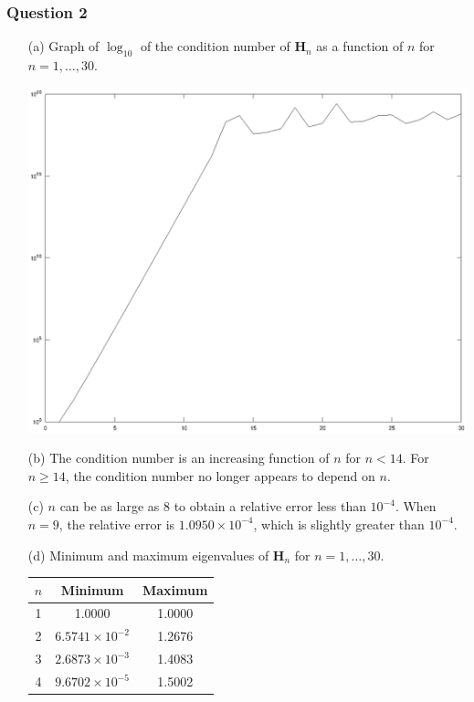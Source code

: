 \documentclass[11pt,a4paper]{article}
\begin{document}
\subsubsection*{Question 2}
\begin{enumerate}
	\item[(a)] Graph of $\log_{10}$ of the condition number of $\mathbf{H}_n$ as a function of $n$ for $n=1, \ldots , 30$.
	\begin{center}
		\includegraphics[width=1.1\textwidth]{chilb.eps}
	\end{center}
	\item[(b)] The condition number is an increasing function of $n$ for $n<14$. For $n \ge 14$, the condition number no longer appears to depend on $n$.
	\item[(c)] $n$ can be as large as 8 to obtain a relative error less than $10^{-4}$. When $n=9$, the relative error is $1.0950 \times 10^{-4}$, which is slightly greater than $10^{-4}$.
	\item[(d)] Minimum and maximum eigenvalues of $\mathbf{H}_n$ for $n=1, \ldots , 30$.	
	\begin{center}
		\begin{tabular}{|c|c|c|}
			\hline
			$n$ &Minimum &Maximum \\
			\hline
			1 &1.0000 &1.0000 \\
			2 &$6.5741 \times 10^{-2}$ &1.2676 \\ 
			3 &$2.6873 \times 10^{-3}$ &1.4083 \\
			4 &$9.6702 \times 10^{-5}$ &1.5002 \\

\end{tabular}
\end{center}
\end{enumerate}
\end{document}
